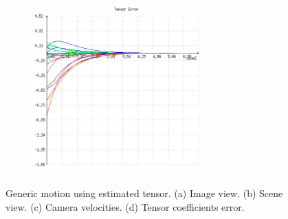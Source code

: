 \begin{figure}[ht!]
\begin{mdframed}[linecolor=black!30,backgroundcolor=black!5]
\begin{subfigure}{.48\textwidth}
    \caption{}
    \label{fig:ex5cvelocity}
  \end{subfigure}
  \begin{subfigure}{.48\textwidth}
    \centering
    \includegraphics[width=65mm]{figures/plots/ex5cerror.png}
    \caption{}
    \label{fig:ex5cerror}
  \end{subfigure}
  \caption{Generic motion using estimated tensor. (a) Image view. (b) Scene view. (c) Camera velocities. (d) Tensor coefficients error.}
  \label{fig:ex5c}
\end{mdframed}
\end{figure}
